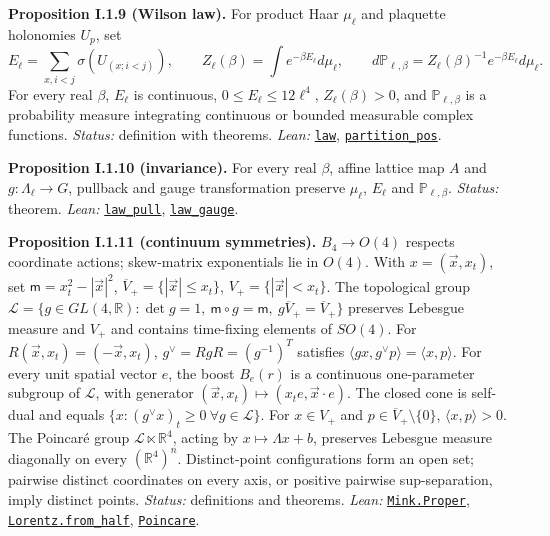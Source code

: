 \documentclass[
  letterpaper,
  11pt]{article}
\begin{document}
\textbf{Proposition I.1.9 (Wilson law).} For product Haar \(\mu_\ell\)
and plaquette holonomies \(U_p\), set
\[E_\ell=\sum_{x,i<j}\sigma(U_{(x;i<j)}),\qquad Z_\ell(\beta)=\int e^{-\beta E_\ell}d\mu_\ell,\qquad d\mathbb P_{\ell,\beta}=Z_\ell(\beta)^{-1}e^{-\beta E_\ell}d\mu_\ell.\]
For every real \(\beta\), \(E_\ell\) is continuous,
\(0\le E_\ell\le12\ell^4\), \(Z_\ell(\beta)>0\), and
\(\mathbb P_{\ell,\beta}\) is a probability measure integrating
continuous or bounded measurable complex functions. \emph{Status:}
definition with theorems. \emph{Lean:}
\href{https://github.com/yang-mills-group/OpenAI-YM-20261028/blob/3456e5e75cf8d4cd558955a5c7638fba2d68f464/YM/Wilson/Law.lean\#L87}{\texttt{law}},
\href{https://github.com/yang-mills-group/OpenAI-YM-20261028/blob/3456e5e75cf8d4cd558955a5c7638fba2d68f464/YM/Wilson/Law.lean\#L76-L80}{\texttt{partition\_pos}}.

\textbf{Proposition I.1.10 (invariance).} For every real \(\beta\),
affine lattice map \(A\) and \(g:\Lambda_\ell\to G\), pullback and gauge
transformation preserve \(\mu_\ell\), \(E_\ell\) and
\(\mathbb P_{\ell,\beta}\). \emph{Status:} theorem. \emph{Lean:}
\href{https://github.com/yang-mills-group/OpenAI-YM-20261028/blob/3456e5e75cf8d4cd558955a5c7638fba2d68f464/YM/Wilson/Symmetry.lean\#L93-L95}{\texttt{law\_pull}},
\href{https://github.com/yang-mills-group/OpenAI-YM-20261028/blob/3456e5e75cf8d4cd558955a5c7638fba2d68f464/YM/Wilson/Symmetry.lean\#L97-L99}{\texttt{law\_gauge}}.

\textbf{Proposition I.1.11 (continuum symmetries).} \(B_4\to O(4)\)
respects coordinate actions; skew-matrix exponentials lie in \(O(4)\).
With \(x=(\vec x,x_t)\), set \(\mathsf m=x_t^2-|\vec x|^2\),
\(\overline V_+=\{|\vec x|\le x_t\}\), \(V_+=\{|\vec x|<x_t\}\). The
topological group
\(\mathcal L=\{g\in GL(4,\mathbb R):\det g=1,\ \mathsf m\circ g=\mathsf m,\ g\overline V_+=\overline V_+\}\)
preserves Lebesgue measure and \(V_+\) and contains time-fixing elements
of \(SO(4)\). For \(R(\vec x,x_t)=(-\vec x,x_t)\),
\(g^\vee=RgR=(g^{-1})^T\) satisfies
\(\langle gx,g^\vee p\rangle=\langle x,p\rangle\). For every unit
spatial vector \(e\), the boost \(B_e(r)\) is a continuous one-parameter
subgroup of \(\mathcal L\), with generator
\((\vec x,x_t)\mapsto(x_te,\vec x\cdot e)\). The closed cone is
self-dual and equals \(\{x:(g^\vee x)_t\ge0\ \forall g\in\mathcal L\}\).
For \(x\in V_+\) and \(p\in\overline V_+\setminus\{0\}\),
\(\langle x,p\rangle>0\). The Poincaré group
\(\mathcal L\ltimes\mathbb R^4\), acting by \(x\mapsto\Lambda x+b\),
preserves Lebesgue measure diagonally on every \((\mathbb R^4)^n\).
Distinct-point configurations form an open set; pairwise distinct
coordinates on every axis, or positive pairwise sup-separation, imply
distinct points. \emph{Status:} definitions and theorems. \emph{Lean:}
\href{https://github.com/yang-mills-group/OpenAI-YM-20261028/blob/3456e5e75cf8d4cd558955a5c7638fba2d68f464/YM/Mink/Lorentz.lean\#L32-L44}{\texttt{Mink.Proper}},
\href{https://github.com/yang-mills-group/OpenAI-YM-20261028/blob/3456e5e75cf8d4cd558955a5c7638fba2d68f464/YM/Mink/Boost.lean\#L135-L158}{\texttt{Lorentz.from\_half}},
\href{https://github.com/yang-mills-group/OpenAI-YM-20261028/blob/3456e5e75cf8d4cd558955a5c7638fba2d68f464/YM/Mink/Poincare.lean\#L32-L34}{\texttt{Poincare}}.
\end{document}
